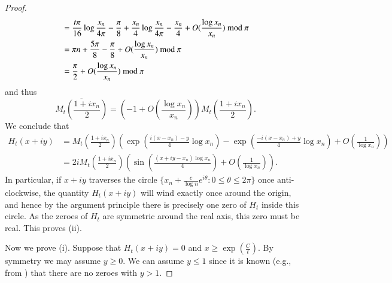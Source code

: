 \begin{proof}
\begin{align*}
&= \frac{t \pi}{16} \log \frac{x_n}{4\pi} - \frac{\pi}{8} 
+ \frac{x_n}{4} \log \frac{x_n}{4\pi} - \frac{x_n}{4} + O( \frac{\log x_n}{x_n} ) \hbox{ mod } \pi\\
&= \pi n + \frac{5\pi}{8} - \frac{\pi}{8} +  O( \frac{\log x_n}{x_n} ) \hbox{ mod } \pi\\
&= \frac{\pi}{2} + O( \frac{\log x_n}{x_n} ) \hbox{ mod } \pi
\end{align*}
and thus
$$ \overline{M_t(\frac{1+ix_n}{2})} = (-1 + O(\frac{\log x_n}{x_n})) M_t(\frac{1+ix_n}{2}).$$
We conclude that
\begin{align*}
 H_t(x+iy) &= M_t(\frac{1+ix_n}{2}) ( \exp( \frac{i(x-x_n) - y}{4} \log x_n) - \exp( \frac{-i(x-x_n) + y}{4} \log x_n) + O(\frac{1}{\log x_n}) )\\
&= 2i M_t(\frac{1+ix_n}{2}) ( \sin( \frac{(x+iy - x_n) \log x_n}{4} ) + O(\frac{1}{\log x_n}) ).
\end{align*}
In particular, if $x+iy$ traverses the circle $\{ x_n + \frac{c}{\log n} e^{i\theta}: 0 \leq \theta \leq 2\pi\}$ once anti-clockwise, the quantity $H_t(x+iy)$ will wind exactly once around the origin, and hence by the argument principle there is precisely one zero of $H_t$ inside this circle.  As the zeroes of $H_t$ are symmetric around the real axis, this zero must be real.  This proves (ii).

Now we prove (i).
Suppose that $H_t(x+iy)=0$ and $x \geq \exp(\frac{C}{t})$.  By symmetry we may assume $y \geq 0$.  We can assume $y \leq 1$ since it is known (e.g., from \cite[Theorem 13]{debr}) that there are no zeroes with $y>1$.  


\end{proof}

